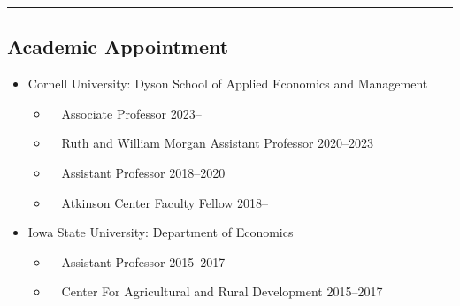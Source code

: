\documentclass[12pt]{res} %
\begin{document}
\begin{resume}
\vspace{-0.08in}
\hrule
\vspace{-0.1in}

\subsection{Academic Appointment}


	\begin{itemize} \itemsep -12pt
	\item[] Cornell University: Dyson School of Applied Economics and Management
		\vspace{-0.05in}
		\begin{itemize} \itemsep -1pt
			\item[] \,\,\,\, Associate Professor \hfill 2023--
			\item[] \,\,\,\, Ruth and William Morgan Assistant Professor \hfill 2020--2023
			\item[] \,\,\,\, Assistant Professor \hfill 2018--2020
			\item[] \,\,\,\, Atkinson Center Faculty Fellow \hfill 2018--\\
		\end{itemize}
		\vspace{0.075in}
		\item[] Iowa State University: Department of Economics
		\vspace{-0.05in}
		\begin{itemize} \itemsep -1pt
			\item[] \,\,\,\, Assistant Professor \hfill 2015--2017
			\item[] \,\,\,\, Center For Agricultural and Rural Development \hfill 2015--2017 \\\
		\end{itemize}
	\end{itemize}
\vspace{-0.5in}


\end{resume}
\end{document}
